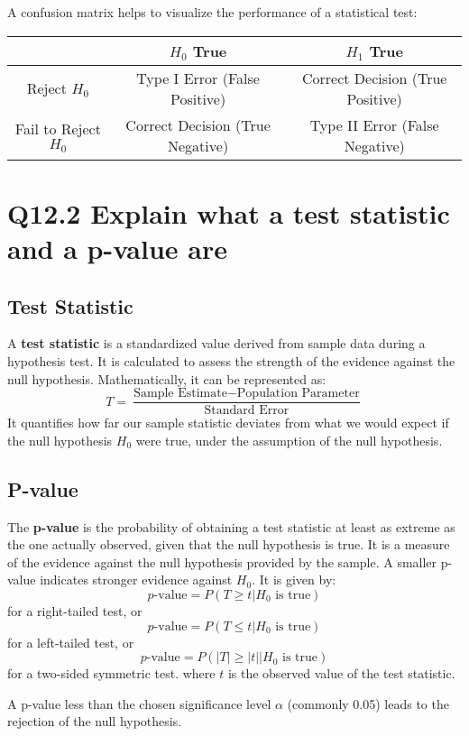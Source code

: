 \documentclass[11pt]{article}
\begin{document}
A confusion matrix helps to visualize the performance of a statistical test:

\begin{center}
\begin{tabular}{|c|c|c|}
\hline
 & $H_0$ True & $H_1$ True \\
\hline
Reject $H_0$ & Type I Error (False Positive) & Correct Decision (True Positive) \\
\hline
Fail to Reject $H_0$ & Correct Decision (True Negative) & Type II Error (False Negative) \\
\hline
\end{tabular}
\end{center}

\section{Q12.2 Explain what a test statistic and a p-value are}

\subsection*{Test Statistic}
A \textbf{test statistic} is a standardized value derived from sample data during a hypothesis test. It is calculated to assess the strength of the evidence against the null hypothesis. Mathematically, it can be represented as:
\[ T = \frac{\text{Sample Estimate} - \text{Population Parameter}}{\text{Standard Error}} \]
It quantifies how far our sample statistic deviates from what we would expect if the null hypothesis $H_0$ were true, under the assumption of the null hypothesis.

\subsection*{P-value}
The \textbf{p-value} is the probability of obtaining a test statistic at least as extreme as the one actually observed, given that the null hypothesis is true. It is a measure of the evidence against the null hypothesis provided by the sample. A smaller p-value indicates stronger evidence against $H_0$. It is given by:
\[ p\text{-value} = P(T \geq t | H_0 \text{ is true}) \]
for a right-tailed test, or 
\[ p\text{-value} = P(T \leq t | H_0 \text{ is true}) \]
for a left-tailed test, or
\[ p\text{-value} = P(|T| \geq |t| | H_0 \text{ is true}) \]
for a two-sided symmetric test.
where $t$ is the observed value of the test statistic.

A p-value less than the chosen significance level $\alpha$ (commonly 0.05) leads to the rejection of the null hypothesis.
\end{document}
